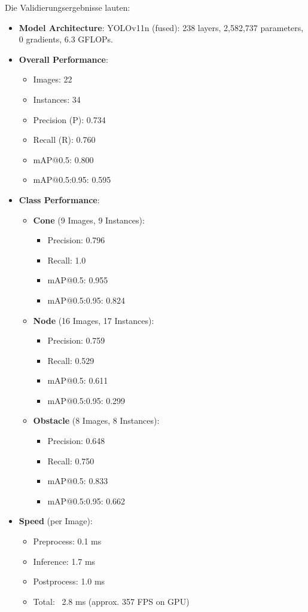 Die Validierungsergebnisse lauten:

\begin{itemize}
    \item \textbf{Model Architecture}: YOLOv11n (fused): 238 layers, 2,582,737 parameters, 0 gradients, 6.3 GFLOPs.
    \item \textbf{Overall Performance}:
    \begin{itemize}
        \item Images: 22
        \item Instances: 34
        \item Precision (P): 0.734
        \item Recall (R): 0.760
        \item mAP@0.5: 0.800
        \item mAP@0.5:0.95: 0.595
    \end{itemize}
    \item \textbf{Class Performance}:
    \begin{itemize}
        \item \textbf{Cone} (9 Images, 9 Instances):
        \begin{itemize}
            \item Precision: 0.796
            \item Recall: 1.0
            \item mAP@0.5: 0.955
            \item mAP@0.5:0.95: 0.824
        \end{itemize}
        \item \textbf{Node} (16 Images, 17 Instances):
        \begin{itemize}
            \item Precision: 0.759
            \item Recall: 0.529
            \item mAP@0.5: 0.611
            \item mAP@0.5:0.95: 0.299
        \end{itemize}
        \item \textbf{Obstacle} (8 Images, 8 Instances):
        \begin{itemize}
            \item Precision: 0.648
            \item Recall: 0.750
            \item mAP@0.5: 0.833
            \item mAP@0.5:0.95: 0.662
        \end{itemize}
    \end{itemize}
    \item \textbf{Speed} (per Image):
    \begin{itemize}
        \item Preprocess: 0.1 ms
        \item Inference: 1.7 ms
        \item Postprocess: 1.0 ms
        \item Total: ~2.8 ms (approx. 357 FPS on GPU)
    \end{itemize}
\end{itemize}


